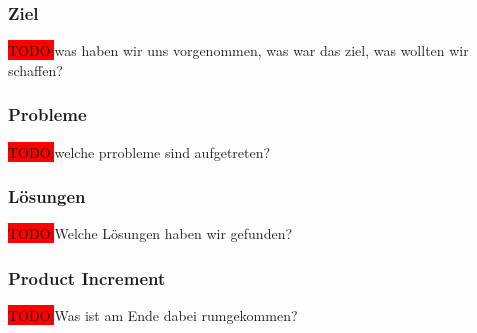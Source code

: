 \documentclass[10pt, a4paper, draft]{article}
\begin{document}
\subsubsection{Ziel}
\colorbox{red}{TODO:}was haben wir uns vorgenommen, was war das ziel, was wollten wir schaffen?
\subsubsection{Probleme}
\colorbox{red}{TODO:}welche prrobleme sind aufgetreten?

\subsubsection{Lösungen}
\colorbox{red}{TODO:}Welche Lösungen haben wir gefunden?

\subsubsection{Product Increment}
\colorbox{red}{TODO:}Was ist am Ende dabei rumgekommen?
\end{document}
